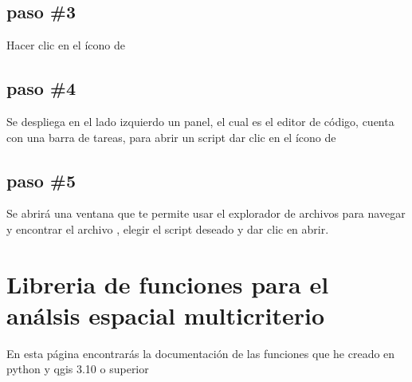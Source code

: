 \documentclass[letterpaper,10pt,spanish]{sphinxmanual}
\begin{document}
\noindent{}


\subsection{paso \#3}
\label{\detokenize{ejecucion:paso-3}}
Hacer clic en el ícono de 

\noindent{}


\subsection{paso \#4}
\label{\detokenize{ejecucion:paso-4}}
Se despliega en el lado izquierdo un panel, el cual es el editor
de código, cuenta con una barra de tareas, para abrir un script
dar clic en el ícono de 

\noindent{}


\subsection{paso \#5}
\label{\detokenize{ejecucion:paso-5}}
Se abrirá una ventana que te permite usar el explorador de archivos
para navegar y encontrar el archivo , elegir el script deseado y
dar clic en abrir.

\noindent{}


\section{Libreria de funciones para el análsis espacial multicriterio}
\label{\detokenize{apcsig:libreria-de-funciones-para-el-analsis-espacial-multicriterio}}\label{\detokenize{apcsig::doc}}
En esta página encontrarás la documentación de las funciones que he creado en python y qgis 3.10 o superior
\end{document}
